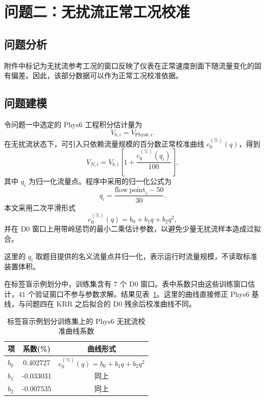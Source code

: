 \section{问题二：无扰流正常工况校准}

\subsection{问题分析}

附件中标记为无扰流参考工况的窗口反映了仪表在正常速度剖面下随流量变化的固有偏差。因此，该部分数据可以作为正常工况校准依据。

\subsection{问题建模}

令问题一中选定的 Phys6 工程积分估计量为
\begin{equation}
V_{b,i}=V_{\mathrm{Phys6},i}.
\end{equation}
在无扰流状态下，可引入只依赖流量规模的百分数正常校准曲线 $c_0^{(\%)}(q)$，得到
\begin{equation}
V_{N,i}=V_{b,i}\left[1+\frac{c_0^{(\%)}(q_i)}{100}\right],
\label{eq:d0_curve}
\end{equation}
其中 $q_i$ 为归一化流量点。程序中采用的归一化公式为
\begin{equation}
q_i=\frac{\mathrm{flow\ point}_i-50}{30}.
\end{equation}
本文采用二次平滑形式
\begin{equation}
c_0^{(\%)}(q)=b_0+b_1q+b_2q^2,
\end{equation}
并在 D0 窗口上用带岭惩罚的最小二乘估计参数，以避免少量无扰流样本造成过拟合。

这里的 $q_i$ 取题目提供的名义流量点并归一化，表示运行时流量规模，不读取标准装置体积。

在标签盲示例划分中，训练集含有 $7$ 个 D0 窗口。表中系数只由这些训练窗口估计，$41$ 个验证窗口不参与参数求解。结果见表~\ref{tab:d0_curve_coef}。这里的曲线直接修正 Phys6 基线，与问题四在 KRR 之后拟合的 D0 残余后校准曲线不同。

\begin{table}[H]
\centering
\caption{标签盲示例划分训练集上的 Phys6 无扰流校准曲线系数}
\label{tab:d0_curve_coef}
\begin{tabular}{lcc}
\toprule
项 & 系数(\%) & 曲线形式 \\
\midrule
$b_0$ & 0.402727 & $c_0^{(\%)}(q)=b_0+b_1q+b_2q^2$ \\
$b_1$ & -0.033031 & 同上 \\
$b_2$ & -0.007535 & 同上 \\
\bottomrule
\end{tabular}
\end{table}

